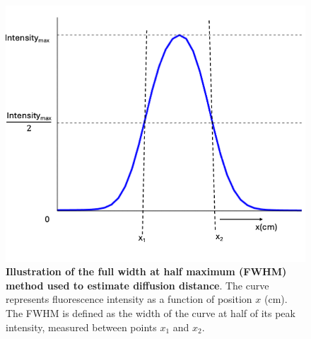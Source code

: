 \begin{figure}[H]
    \centering
    \vspace{-0.5em}
    \begin{minipage}{0.75\textwidth}
        \centering
        \includegraphics[width=\linewidth]{figures/fwhm_plots.png}
        \vspace{-3em}
        \caption{\textbf{Illustration of the full width at half maximum (FWHM) method used to 
        estimate diffusion distance}. The curve represents fluorescence intensity as a 
        function of position $x$ (cm). The FWHM is defined as the width of the curve at half of 
        its peak intensity, measured between points $x_1$ and $x_2$.}
        \label{fig:full_width_half_maximum}
    \end{minipage}
\end{figure}

